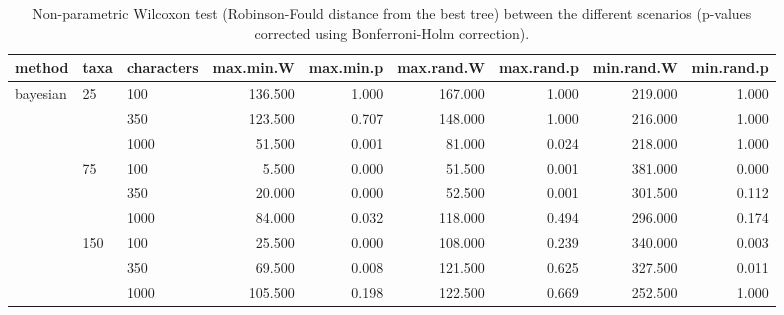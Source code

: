 \begin{table}[ht]
\centering
\begin{tabular}{lllrrrrrr}
  \hline
method & taxa & characters & max.min.W & max.min.p & max.rand.W & max.rand.p & min.rand.W & min.rand.p \\ 
  \hline
bayesian & 25 & 100 & 136.500 & 1.000 & 167.000 & 1.000 & 219.000 & 1.000 \\ 
   &  & 350 & 123.500 & 0.707 & 148.000 & 1.000 & 216.000 & 1.000 \\ 
   &  & 1000 & 51.500 & 0.001 & 81.000 & 0.024 & 218.000 & 1.000 \\ 
   & 75 & 100 & 5.500 & 0.000 & 51.500 & 0.001 & 381.000 & 0.000 \\ 
   &  & 350 & 20.000 & 0.000 & 52.500 & 0.001 & 301.500 & 0.112 \\ 
   &  & 1000 & 84.000 & 0.032 & 118.000 & 0.494 & 296.000 & 0.174 \\ 
   & 150 & 100 & 25.500 & 0.000 & 108.000 & 0.239 & 340.000 & 0.003 \\ 
   &  & 350 & 69.500 & 0.008 & 121.500 & 0.625 & 327.500 & 0.011 \\ 
   &  & 1000 & 105.500 & 0.198 & 122.500 & 0.669 & 252.500 & 1.000 \\ 
   \hline
\end{tabular}
\caption{Non-parametric Wilcoxon test (Robinson-Fould distance from the best tree) between the different scenarios (p-values corrected using Bonferroni-Holm correction).} 
\label{Full_Tab_Bayesian_WXRFbest}
\end{table}

